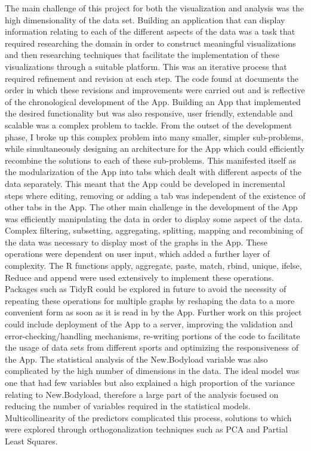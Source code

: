 The main challenge of this project for both the visualization and analysis was the high dimensionality of the data set. Building an application that can display information relating to each of the different aspects of the data was a task that required researching the domain in order to construct meaningful visualizations and then researching techniques that facilitate the implementation of these visualizations through a suitable platform. This was an iterative process that required refinement and revision at each step. The code found at \cite{ShinyServer} documents the order in which these revisions and improvements were carried out and is reflective of the chronological development of the App.
\hfill\break
\newline
Building an App that implemented the desired functionality but was also responsive, user friendly, extendable and scalable was a complex problem to tackle. From the outset of the development phase, I broke up this complex problem into many smaller, simpler sub-problems, while simultaneously designing an architecture for the App which could efficiently recombine the solutions to each of these sub-problems. This manifested itself as the modularization of the App into tabs which dealt with different aspects of the data separately. This meant that the App could be developed in incremental steps where editing, removing or adding a tab was independent of the existence of other tabs in the App. 
\hfill\break
\newline
The other main challenge in the development of the App was efficiently manipulating the data in order to display some aspect of the data. Complex filtering, subsetting, aggregating, splitting, mapping and recombining of the data was necessary to display most of the graphs in the App. These operations were dependent on user input, which added a further layer of complexity. The R functions apply, aggregate, paste, match, rbind, unique, ifelse, Reduce and append were used extensively to implement these operations. Packages such as TidyR could be explored in future to avoid the necessity of repeating these operations for multiple graphs by reshaping the data to a more convenient form as soon as it is read in by the App. Further work on this project could include deployment of the App to a server, improving the validation and error-checking/handling mechanisms, re-writing portions of the code to facilitate the usage of data sets from different sports and optimizing the responsiveness of the App.
\hfill\break
\newline
The statistical analysis of the New.Bodyload variable was also complicated by the high number of dimensions in the data. The ideal model was one that had few variables but also explained a high proportion of the variance relating to New.Bodyload, therefore a large part of the analysis focused on reducing the number of variables required in the statistical models. Multicollinearity of the predictors complicated this process, solutions to which were explored through orthogonalization techniques such as PCA and Partial Least Squares.
